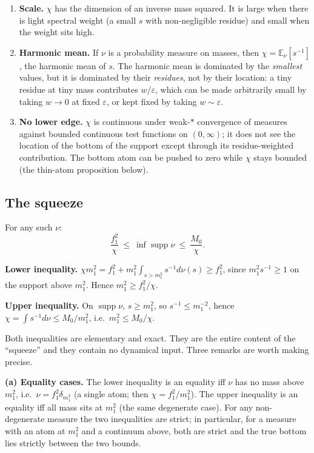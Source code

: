 \begin{enumerate}
\item \textbf{Scale.} $\chi$ has the dimension of an inverse mass squared. It is large when
  there is light spectral weight (a small $s$ with non-negligible residue) and small when the
  weight sits high.
\item \textbf{Harmonic mean.} If $\nu$ is a probability measure on masses, then
  $\chi=\mathbb{E}_\nu[s^{-1}]$, the harmonic mean of $s$. The harmonic mean is dominated by the
  \emph{smallest} values, but it is dominated by their \emph{residues}, not by their location:
  a tiny residue at tiny mass contributes $w/\varepsilon$, which can be made arbitrarily small by
  taking $w\to0$ at fixed $\varepsilon$, or kept fixed by taking $w\sim\varepsilon$.
\item \textbf{No lower edge.} $\chi$ is continuous under weak-$*$ convergence of measures against
  bounded continuous test functions on $(0,\infty)$; it does not see the location of the bottom
  of the support except through its residue-weighted contribution. The bottom atom can be pushed
  to zero while $\chi$ stays bounded (the thin-atom proposition below).
\end{enumerate}

\subsection{The squeeze \LT}
\label{sec:squeeze-thm}

For any such $\nu$:
\begin{equation}
\frac{f_1^2}{\chi}\ \le\ \inf\operatorname{supp}\nu\ \le\ \frac{M_0}{\chi}.
\label{eq:squeeze}
\end{equation}
\begin{proofx}
\textbf{Lower inequality.} $\chi m_1^2=f_1^2+m_1^2\int_{s>m_1^2}s^{-1}d\nu(s)\ge f_1^2$, since
$m_1^2s^{-1}\ge1$ on the support above $m_1^2$. Hence $m_1^2\ge f_1^2/\chi$.

\textbf{Upper inequality.} On $\operatorname{supp}\nu$, $s\ge m_1^2$, so $s^{-1}\le m_1^{-2}$,
hence $\chi=\int s^{-1}d\nu\le M_0/m_1^2$, i.e.\ $m_1^2\le M_0/\chi$.
\end{proofx}

Both inequalities are elementary and exact. They are the entire content of the ``squeeze'' and
they contain no dynamical input. Three remarks are worth making precise.

\textbf{(a) Equality cases.} The lower inequality is an equality iff $\nu$ has no mass above
$m_1^2$, i.e.\ $\nu=f_1^2\delta_{m_1^2}$ (a single atom; then $\chi=f_1^2/m_1^2$). The upper
inequality is an equality iff all mass sits at $m_1^2$ (the same degenerate case). For any
non-degenerate measure the two inequalities are strict; in particular, for a measure with an atom
at $m_1^2$ and a continuum above, both are strict and the true bottom lies strictly between the
two bounds.

